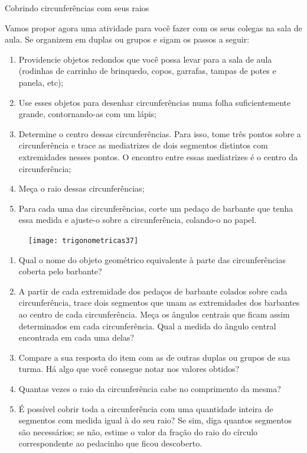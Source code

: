 \begin{task}{Cobrindo circunferências com seus raios}
\label{trig-ativ7}

Vamos propor agora uma atividade para você fazer com os seus colegas na sala de aula. Se organizem em duplas ou grupos e sigam os passos a seguir:
\begin{enumerate}[label=\titem{\arabic*.}, wide, left=0pt]
\item Providencie objetos redondos que você possa levar para a sala de aula (rodinhas de carrinho de brinquedo, copos, garrafas, tampas de potes e panela, etc);
\item Use esses objetos para desenhar circunferências numa folha suficientemente grande, contornando-as com um lápis;
\item Determine o centro dessas circunferências. Para isso, tome três pontos sobre a circunferência e trace as mediatrizes de dois segmentos distintos com extremidades nesses pontos. O encontro entre essas mediatrizes é o centro da circunferência;
\item Meça o raio dessas circunferências;
\item Para cada uma das circunferências, corte um pedaço de barbante que tenha essa medida e ajuste-o sobre a circunferência, colando-o no papel.
\end{enumerate}

\begin{figure}[H]
\centering

\texttt{[image: trigonometricas37]}
\end{figure}

\begin{enumerate}
\item Qual o nome do objeto geométrico equivalente à parte das circunferências coberta pelo barbante?
\item A partir de cada extremidade dos pedaços de barbante colados sobre cada circunferência, trace dois segmentos que unam as extremidades dos barbantes ao centro de cada circunferência. Meça os ângulos centrais que ficam assim determinados em cada circunferência. Qual a medida do ângulo central encontrada em cada uma delas?
\item Compare a sua resposta do item  com as de outras duplas ou grupos de sua turma. Há algo que você consegue notar nos valores obtidos?
\item Quantas vezes o raio da circunferência cabe no comprimento da mesma?
\item É possível cobrir toda a circunferência com uma quantidade inteira de segmentos com medida igual à do seu raio? Se sim, diga quantos segmentos são necessários; se não, estime o valor da fração do raio do círculo correspondente ao pedacinho que ficou descoberto.
\end{enumerate}
\end{task}


